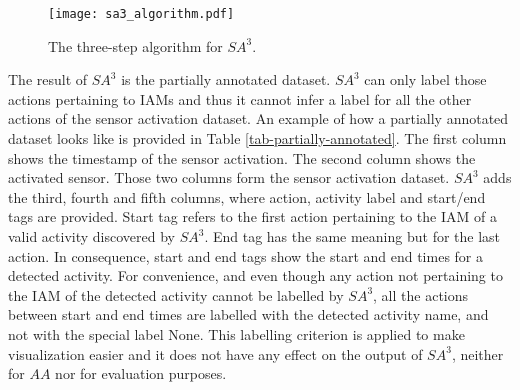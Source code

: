 \begin{figure}[htbp]
\centering
\texttt{[image: sa3\_algorithm.pdf]}
    \caption{The three-step algorithm for $SA^3$.}
    \label{fig:sa3_algorithm}
\end{figure}

The result of $SA^3$ is the partially annotated dataset. $SA^3$ can only label those actions pertaining to IAMs and thus it cannot infer a label for all the other actions of the sensor activation dataset. An example of how a partially annotated dataset looks like is provided in Table \ref{tab-partially-annotated}. The first column shows the timestamp of the sensor activation. The second column shows the activated sensor. Those two columns form the sensor activation dataset. $SA^3$ adds the third, fourth and fifth columns, where action, activity label and start/end tags are provided. Start tag refers to the first action pertaining to the IAM of a valid activity discovered by $SA^3$. End tag has the same meaning but for the last action. In consequence, start and end tags show the start and end times for a detected activity. For convenience, and even though any action not pertaining to the IAM of the detected activity cannot be labelled by $SA^3$, all the actions between start and end times are labelled with the detected activity name, and not with the special label None. This labelling criterion is applied to make visualization easier and it does not have any effect on the output of $SA^3$, neither for $AA$ nor for evaluation purposes.

\begin{comment}
\begin{figure}[htbp]
\begin{scriptsize}
\begin{lstlisting}
2014-05-23 07:42:17.106962,wsugarSens,hasFlavour,None,
2014-05-23 07:49:17.310460,bedSens,useFurniture,None,
2014-05-23 09:43:44.128079,cupSens,hasContainer,MakeChocolate,start
2014-05-23 09:47:33.984341,storeSens,openStore,MakeChocolate,
2014-05-23 09:47:39.333528,potSens,useCookingUtensil,MakeChocolate,
2014-05-23 09:47:52.750216,cookerSens,useCookingAppliance,MakeChocolate,
2014-05-23 09:48:07.764138,fridgeSens,openFridge,MakeChocolate,
2014-05-23 09:48:12.591836,wmilkSens,hasMilk,MakeChocolate,
2014-05-23 09:48:47.199512,chocoSens,hasChocolate,MakeChocolate,end
2014-05-23 09:54:11.553695,mugSens,hasContainer,None,
\end{lstlisting}
\end{scriptsize}
\caption{Example of a partially annotated dataset, the output of the $SA^3$ algorithm.}
\label{fig-partially-annotated}
\end{figure}
\end{comment}

